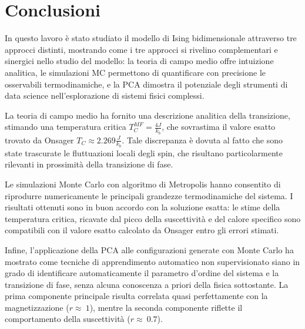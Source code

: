 \section{Conclusioni}
In questo lavoro è stato studiato il modello di Ising bidimensionale attraverso tre approcci distinti, mostrando 
come i tre approcci si rivelino complementari e sinergici nello studio del modello: 
la teoria di campo medio offre intuizione analitica, le simulazioni MC permettono di quantificare con precisione 
le osservabili termodinamiche, 
e la PCA dimostra il potenziale degli strumenti di data science nell'esplorazione di sistemi fisici complessi.

La teoria di campo medio ha fornito una descrizione analitica della transizione, 
stimando una temperatura critica $T_C^{MF}= \frac{4J}{k_b}$, che sovrastima il valore esatto trovato da Onsager $ T_C \approx 2.269 \frac{J}{k_b}$.
Tale discrepanza è dovuta al fatto che sono state trascurate le fluttuazioni locali degli spin, che risultano particolarmente rilevanti in prossimità della transizione di fase.

Le simulazioni Monte Carlo con algoritmo di Metropolis hanno consentito 
di riprodurre numericamente le principali grandezze termodinamiche del sistema. I risultati ottenuti
sono in buon accordo con la soluzione esatta: le stime della temperatura critica, ricavate 
dal picco della suscettività e del calore specifico sono compatibili con il valore esatto calcolato da Onsager entro 
gli errori stimati.

Infine, l'applicazione della PCA alle configurazioni generate con 
Monte Carlo ha mostrato come tecniche di apprendimento 
automatico non supervisionato siano in grado di identificare 
automaticamente il parametro d'ordine del sistema e la transizione di fase, 
senza alcuna conoscenza a priori della fisica sottostante. La prima componente principale
risulta correlata quasi perfettamente con la magnetizzazione ($r \approx \ 1$), mentre 
la seconda componente riflette il comportamento della suscettività ($ r \approx \ 0.7$).
